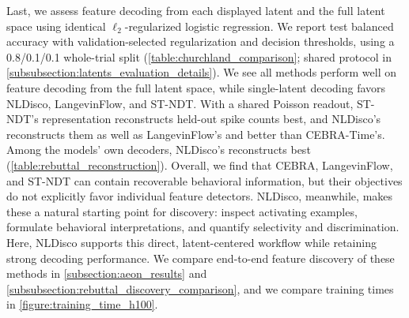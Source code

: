 Last, we assess feature decoding from each displayed latent and the full latent space using identical $\ell_2$-regularized logistic regression. We report test balanced accuracy with validation-selected regularization and decision thresholds, using a 0.8/0.1/0.1 whole-trial split (\autoref{table:churchland_comparison}; shared protocol in \hyperref[paragraph:latent_decoding]{\ref*{subsubsection:latents_evaluation_details}}). We see all methods perform well on feature decoding from the full latent space, while single-latent decoding favors NLDisco, LangevinFlow, and ST-NDT. With a shared Poisson readout, ST-NDT's representation reconstructs held-out spike counts best, and NLDisco's reconstructs them as well as LangevinFlow's and better than CEBRA-Time's. Among the models' own decoders, NLDisco's reconstructs best (\autoref{table:rebuttal_reconstruction}). Overall, we find that CEBRA, LangevinFlow, and ST-NDT can contain recoverable behavioral information, but their objectives do not explicitly favor individual feature detectors. NLDisco, meanwhile, makes these a natural starting point for discovery: inspect activating examples, formulate behavioral interpretations, and quantify selectivity and discrimination. Here, NLDisco supports this direct, latent-centered workflow while retaining strong decoding performance. We compare end-to-end feature discovery of these methods in \hyperref[subsection:aeon_results]{\ref*{subsection:aeon_results}} and \hyperref[subsubsection:rebuttal_discovery_comparison]{\ref*{subsubsection:rebuttal_discovery_comparison}}, and we compare training times in \autoref{figure:training_time_h100}.

\begin{table}[tb]
    \centering
    {\setlength{\tabcolsep}{3pt}\resizebox{\linewidth}{!}{}}
    \caption{\textbf{Feature recovery and decoding.} , , ,  and feature decoding scores for features and latents shown in \autoref{fig:churchland_results}. ``Single decode'' uses individual latents, while ``All decode'' uses the entire latent space.  reports test balanced accuracy from logistic regression with validation-selected decision thresholds and a 0.8/0.1/0.1 whole-trial split (\hyperref[paragraph:latent_decoding]{\ref*{subsubsection:latents_evaluation_details}}). Column maxima are bolded, including ties.}
    \label{table:churchland_comparison}
\end{table}
